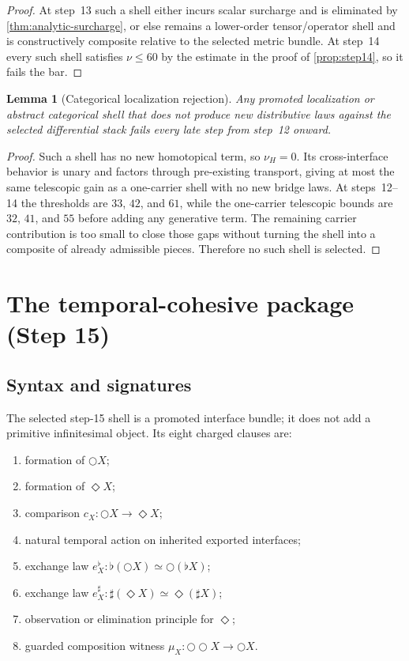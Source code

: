 \documentclass[11pt]{article}
\theoremstyle{plain}
\newtheorem{lemma}[theorem]{Lemma}
\theoremstyle{definition}
\theoremstyle{remark}
\begin{document}
\begin{proof}
At step~13 such a shell either incurs scalar surcharge and is eliminated by \cref{thm:analytic-surcharge}, or else remains a lower-order tensor/operator shell and is constructively composite relative to the selected metric bundle. At step~14 every such shell satisfies $\nu\le60$ by the estimate in the proof of \cref{prop:step14}, so it fails the bar.
\end{proof}

\begin{lemma}[Categorical localization rejection]
\label{lem:categorical-rejection}
Any promoted localization or abstract categorical shell that does not produce new distributive laws against the selected differential stack fails every late step from step~12 onward.
\end{lemma}

\begin{proof}
Such a shell has no new homotopical term, so $\nu_H=0$. Its cross-interface behavior is unary and factors through pre-existing transport, giving at most the same telescopic gain as a one-carrier shell with no new bridge laws. At steps~12--14 the thresholds are $33$, $42$, and $61$, while the one-carrier telescopic bounds are $32$, $41$, and $55$ before adding any generative term. The remaining carrier contribution is too small to close those gaps without turning the shell into a composite of already admissible pieces. Therefore no such shell is selected.
\end{proof}

\section{The temporal-cohesive package (Step 15)}

\subsection{Syntax and signatures}

The selected step-15 shell is a promoted interface bundle; it does not add a primitive infinitesimal object. Its eight charged clauses are:
\begin{enumerate}
    \item formation of $\bigcirc X$;
    \item formation of $\Diamond X$;
    \item comparison $c_X:\bigcirc X\to\Diamond X$;
    \item natural temporal action on inherited exported interfaces;
    \item exchange law $e^\flat_X:\flat(\bigcirc X)\simeq\bigcirc(\flat X)$;
    \item exchange law $e^\sharp_X:\sharp(\Diamond X)\simeq\Diamond(\sharp X)$;
    \item observation or elimination principle for $\Diamond$;
    \item guarded composition witness $\mu_X:\bigcirc\bigcirc X\to\bigcirc X$.
\end{enumerate}
\end{document}

